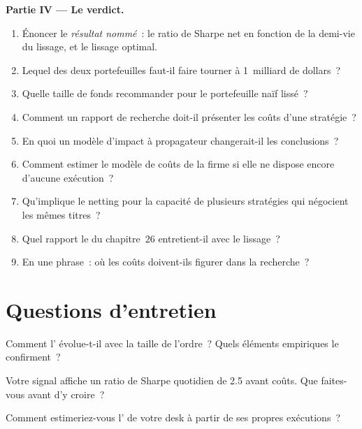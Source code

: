 \begin{problem}
\medskip\noindent\textbf{Partie IV --- Le verdict.}
\begin{enumerate}[resume]
\item Énoncer le \emph{résultat nommé}~: le ratio de Sharpe net en fonction de la demi-vie du lissage, et le lissage optimal.
\item Lequel des deux portefeuilles faut-il faire tourner à 1~milliard de dollars~?
\item Quelle taille de fonds recommander pour le portefeuille naïf lissé~?
\item Comment un rapport de recherche doit-il présenter les coûts d'une stratégie~?
\item En quoi un modèle d'impact à propagateur changerait-il les conclusions~?
\item Comment estimer le modèle de coûts de la firme si elle ne dispose encore d'aucune exécution~?
\item Qu'implique le netting pour la capacité de plusieurs stratégies qui négocient les mêmes titres~?
\item Quel rapport le  du chapitre~26 entretient-il avec le lissage~?
\item En une phrase~: où les coûts doivent-ils figurer dans la recherche~?
\end{enumerate}
\end{problem}

\section{Questions d'entretien}

\begin{interviewq}\label{iq:rs:transaction-costs-in-research:1}
Comment l' évolue-t-il avec la taille de l'ordre~? Quels éléments empiriques le confirment~?
\end{interviewq}

\begin{interviewq}\label{iq:rs:transaction-costs-in-research:2}
Votre signal affiche un ratio de Sharpe quotidien de 2.5 avant coûts. Que faites-vous avant d'y croire~?
\end{interviewq}

\begin{interviewq}\label{iq:rs:transaction-costs-in-research:3}
Comment estimeriez-vous l' de votre desk à partir de ses propres exécutions~?
\end{interviewq}

